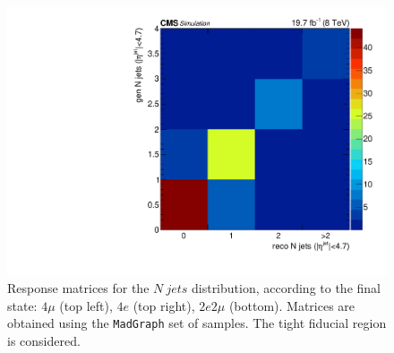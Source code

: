 \begin{figure}[hbtp]
\begin{center}
    \includegraphics[width=\cmsFigWidth]{Figures/ResMat_qqggJJ_Jets_ZZTo2e2m_st_01_fr_Mad}     
    \caption{Response matrices for the $N\ jets$ distribution, according to the final state:  $4\mu$ (top left), $4e$ (top right), $2e2\mu$  (bottom). Matrices are obtained using the  \texttt{MadGraph} set of samples. The tight fiducial region is considered.} 
    \label{fig:Jets_matrices}
  \end{center}
\end{figure}
